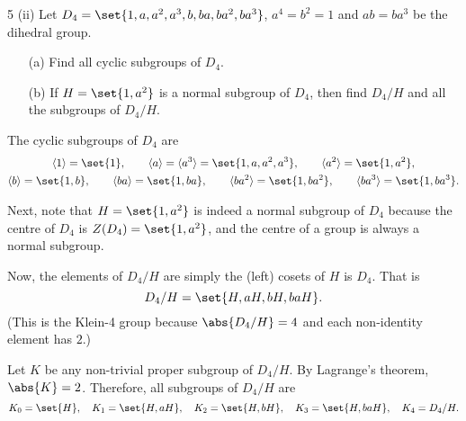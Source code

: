 \documentclass[11pt]{penrose}
\begin{document}
\begin{problem}{5 (ii)}
    Let $D_4 = \set{1, a, a^2, a^3, b, ba, ba^2, ba^3}$, $a^4 = b^2 = 1$ and $ab = ba^3$ be the dihedral group.
    \begin{enumerate}
        \item[(a)] Find all cyclic subgroups of $D_4$.
        \item[(b)] If $H = \set{1,a^2}$ is a normal subgroup of $D_4$, then find $D_4/H$ and all the subgroups of $D_4/H$.
    \end{enumerate}

    \solution The cyclic subgroups of $D_4$ are
    \begin{gather*}
        \cyclic{1} = \set{1}, \qquad
        \cyclic{a} = \cyclic{a^3} = \set{1, a, a^2, a^3}, \qquad
        \cyclic{a^2} = \set{1, a^2},\\
        \cyclic{b} = \set{1, b}, \qquad
        \cyclic{ba} = \set{1, ba}, \qquad
        \cyclic{ba^2} = \set{1, ba^2}, \qquad
        \cyclic{ba^3} = \set{1, ba^3}.
    \end{gather*}

    Next, note that $H = \set{1,a^2}$ is indeed a normal subgroup of $D_4$ because the centre of $D_4$ is $Z(D_4) = \set{1,a^2}$, and the centre of a group is always a normal subgroup.

    Now, the elements of $D_4/H$ are simply the (left) cosets of $H$ is $D_4$. That is
    \begin{equation*}
        D_4/H = \set{H, aH, bH, baH}.
    \end{equation*}
    (This is the Klein-4 group because $\abs{D_4/H} = 4$ and each non-identity element has $2$.)

    Let $K$ be any non-trivial proper subgroup of $D_4/H$. By Lagrange's theorem, $\abs{K} = 2$. Therefore, all subgroups of $D_4/H$ are
    \begin{equation*}
        K_0 = \set{H}, \quad
        K_1 = \set{H, aH}, \quad
        K_2 = \set{H, bH}, \quad
        K_3 = \set{H, baH}, \quad
        K_4 = D_4/H.
    \end{equation*}
\end{problem}
\end{document}
